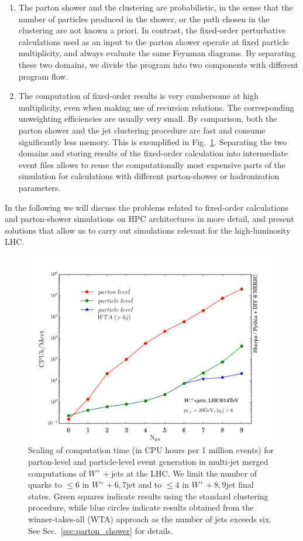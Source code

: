 \documentclass[aps,prd,twocolumn,fleqn,superscriptaddress,groupedaddress,nofootinbib,preprintnumbers]{revtex4}
\begin{document}
\begin{enumerate}
\item The parton shower and the clustering are probabilistic, in the sense that
  the number of particles produced in the shower, or the path chosen in the clustering
  are not known a priori. In contrast, the fixed-order perturbative calculations
  used as an input to the parton shower operate at fixed particle multiplicity,
  and always evaluate the same Feynman diagrams. By separating these two domains,
  we divide the program into two components with different program flow.
\item The computation of fixed-order results is very cumbersome at high multiplicity,
  even when making use of recursion relations. The corresponding unweighting
  efficiencies are usually very small. By comparison, both the parton shower and
  the jet clustering procedure are fast and consume significantly less memory.
  This is exemplified in Fig.~\ref{fig:timing}.
  Separating the two domains and storing results of the fixed-order calculation
  into intermediate event files allows to reuse the computationally most expensive
  parts of the simulation for calculations with different parton-shower or
  hadronization parameters.
\end{enumerate}
In the following we will discuss the problems related to fixed-order
calculations and parton-shower simulations on HPC architectures
in more detail, and present solutions that allow us to carry out
simulations relevant for the high-luminosity LHC.
\begin{figure}
  \includegraphics[width=\linewidth]{fig/timing.pdf}
  \caption{Scaling of computation time (in CPU hours per 1 million events)
    for parton-level and particle-level event generation in multi-jet merged
    computations of $W^++$jets at the LHC. We limit the number of quarks
    to $\le6$ in $W^++6,7$jet and to $\le4$ in $W^++8,9$jet final states.
    Green squares indicate results using the
    standard clustering procedure, while blue circles indicate results
    obtained from the winner-takes-all (WTA) approach as the number of jets
    exceeds six. See Sec.~\ref{sec:parton_shower} for details.}
  \label{fig:timing}
\end{figure}
\end{document}
